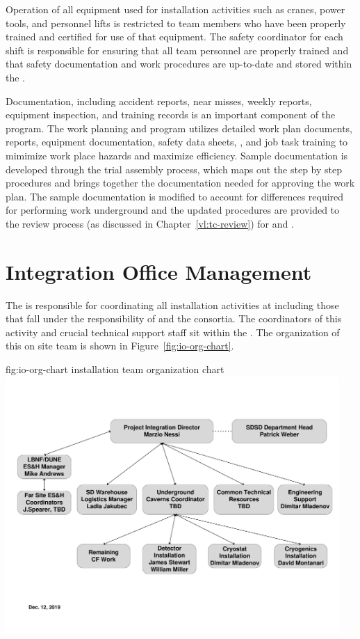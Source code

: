 Operation of all equipment used for installation activities such as
cranes, power tools, and personnel lifts is restricted to team members
who have been properly trained and certified for use of that
equipment.  The safety coordinator for each shift is responsible for
ensuring that all team personnel are properly trained and that safety
documentation and work procedures are up-to-date and stored within the
.

Documentation, including accident reports, near misses, weekly
reports, equipment inspection, and training records is an important
component of the   program. The work
planning and  program utilizes detailed work plan documents,
 reports, equipment documentation, safety data sheets,
, and job task training to mimimize work place hazards and
maximize efficiency.  Sample documentation is developed through the
 trial assembly process, which maps out the step by
step procedures and brings together the documentation needed for
approving the work plan.  The sample documentation is modified to
account for differences required for performing work underground and
the updated procedures are provided to the review process (as
discussed in Chapter~\ref{vl:tc-review}) for  and
.

\section{Integration Office Management}
\label{vl:tc-facility_mgmt}

The  is responsible for coordinating all installation
activities at  including those that fall under the %
responsibility of  and the  consortia.  
The coordinators of this activity and crucial technical support
staff sit within the .  The organization of this on site team is 
shown in Figure~\ref{fig:io-org-chart}.
\begin{dunefigure}{fig:io-org-chart}
  { installation team organization chart}
  \includegraphics[width=0.95\textwidth]{graphics/org-farsite-io.pdf}
\end{dunefigure}
 
